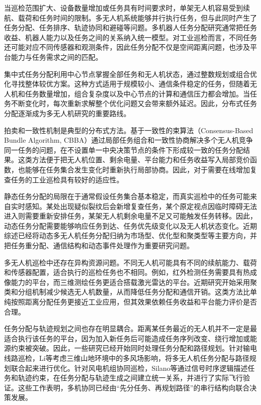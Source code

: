 当巡检范围扩大、设备数量增加或任务具有时间要求时，单架无人机容易受到续航、载荷和任务时间的限制。多无人机系统能够并行执行任务，但与此同时产生了任务分配、任务排序、轨迹协同和避碰等问题。多机器人任务分配研究通常把任务收益、机器人能力以及任务之间的关系纳入统一模型\cite{Gerkey2004,Chakraa2023,ivic2023multiuavinspection,gilcastilla2024hetero,jeong2023makespan,obrien2023dynamictask}。对工业巡检而言，不同任务还可能对应不同传感器和观测条件，因此任务分配不仅是空间距离问题，也涉及平台能力与任务需求之间的匹配。

集中式任务分配利用中心节点掌握全部任务和无人机状态，通过整数规划或组合优化寻找整体较优方案。这种方式适用于规模较小、通信条件稳定的任务，但随着无人机和任务数量增加，组合复杂度以及中心节点的计算和通信压力都会增加\cite{Chakraa2023}。当任务不断变化时，每次重新求解整个优化问题又会带来额外延迟。因此，分布式任务分配逐渐成为多无人机研究的重要路线。

拍卖和一致性机制是典型的分布式方法。基于一致性的束算法（Consensus-Based Bundle Algorithm, CBBA）通过局部任务组合和一致性协商解决多个无人机竞争同一任务的问题，在不设置单一中央决策节点的条件下形成较一致的任务分配结果\cite{Choi2009}。这类方法便于把无人机位置、剩余电量、平台能力和任务收益写入局部竞价函数，也能够在任务集合发生变化时重新执行局部协商。因此，对于需要在线增加复查任务的工业巡检具有较好的适应性。

静态任务分配的局限在于通常假设任务集合基本稳定，而真实巡检中的任务可能来自实时感知。某处出现疑似裂纹后会新增复查任务，某个原定视点因临时障碍无法进入则需要重新安排任务，某架无人机剩余电量不足又可能触发任务转移。因此，动态任务分配需要能够响应任务到达、任务优先级变化以及无人机状态变化。近期综述已经将动态多无人机任务分配归纳为市场型、优化型和聚类型等主要方向，并把任务重分配、通信结构和动态事件处理作为重要研究问题\cite{Alqefari2025,obrien2023dynamictask,fei2022limitedcomm,Song2023MultiUAVMission}。

多无人机巡检中还存在异构资源问题。不同无人机可能具有不同的续航能力、载荷和传感器配置，适合执行的巡检任务也不相同。例如，红外检测任务需要具有热成像能力的平台，而三维测绘任务更适合搭载激光雷达的平台。近期研究开始采用聚类和分组机制减少候选无人机数量，从而降低任务分配和通信开销\cite{Dong2025,jacobsen2023swarm,gilcastilla2024hetero,jeong2023makespan}。这类方法比单纯按照距离分配任务更接近工业应用，但其效果依赖任务收益和平台能力评价是否合理。

任务分配与轨迹规划之间也存在明显耦合。距离某任务最近的无人机并不一定是最适合执行该任务的平台，因为加入新任务后可能造成任务序列改变、绕行增加或能源约束被突破。因此，一些研究已经开始同时处理任务分配和路径规划。针对输电线路巡检，Li等考虑三维山地环境中的多风场影响，将多无人机任务分配与路径规划联合起来进行优化\cite{Li2024Wind,ivic2023multiuavinspection}。针对风电机组协同巡检，Silano等通过信号时序逻辑描述任务和轨迹约束，在任务分配与轨迹生成之间建立统一关系，并进行了实际飞行验证\cite{Silano2024}。这些工作表明，多机协同已经由“先分任务、再规划路径”的串行结构向联合决策发展。

